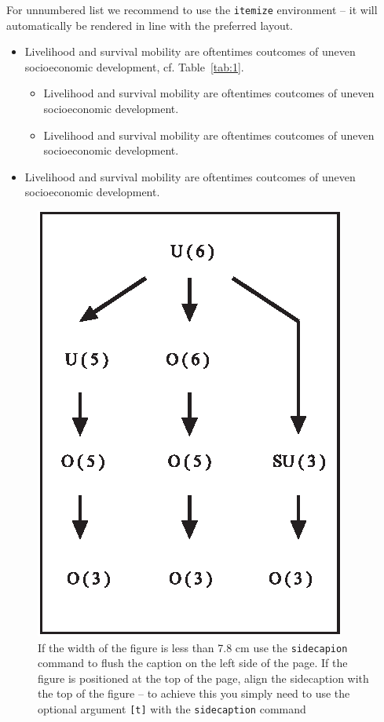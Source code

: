 \documentclass[graybox]{svmult}
\begin{document}
For unnumbered list we recommend to use the \verb|itemize| environment -- it will automatically be rendered in line with the preferred layout.

\begin{itemize}
\item{Livelihood and survival mobility are oftentimes coutcomes of uneven socioeconomic development, cf. Table~\ref{tab:1}.}
\begin{itemize}
\item{Livelihood and survival mobility are oftentimes coutcomes of uneven socioeconomic development.}
\item{Livelihood and survival mobility are oftentimes coutcomes of uneven socioeconomic development.}
\end{itemize}
\item{Livelihood and survival mobility are oftentimes coutcomes of uneven socioeconomic development.}
\end{itemize}

\begin{figure}[t]
\sidecaption[t]
\includegraphics[scale=.65]{figure}
%
%
\caption{If the width of the figure is less than 7.8 cm use the \texttt{sidecapion} command to flush the caption on the left side of the page. If the figure is positioned at the top of the page, align the sidecaption with the top of the figure -- to achieve this you simply need to use the optional argument \texttt{[t]} with the \texttt{sidecaption} command}
\label{fig:2}       %
\end{figure}
\end{document}
